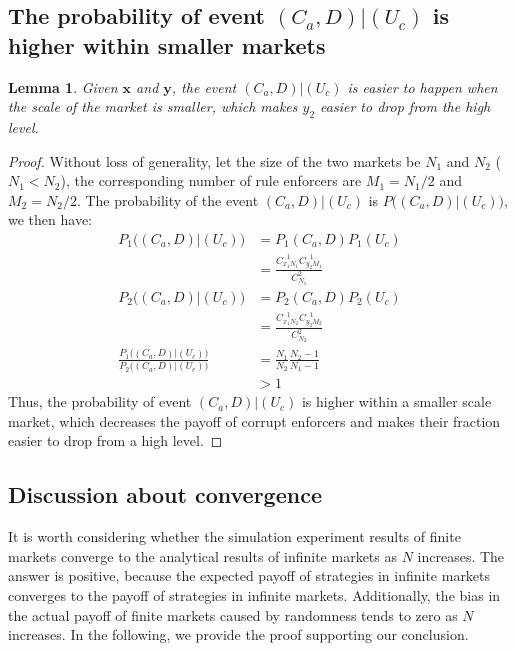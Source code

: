 \documentclass[letterpaper,10pt]{article}
\numberwithin{equation}{section}
\newtheorem{lemma}[theorem]{Lemma}
\begin{document}
\subsection{The probability of event \texorpdfstring{$ (C_{a}, D)|(U_{c}) $ is higher within smaller markets}{(Ca, D)|(Uc)}}\label{AppendixC5}
\begin{lemma}
    Given $ \mathbf{x} $ and $ \mathbf{y} $, the event $ (C_{a}, D)|(U_{c}) $ is easier to happen when the scale of the market is smaller, which makes $ y_{2} $ easier to drop from the high level.
    \label{L3}
\end{lemma}

\begin{proof}
    Without loss of generality, let the size of the two markets be $ N_{1} $ and $ N_{2} $ ($ N_{1} < N_{2} $), the corresponding number of rule enforcers are $ M_{1} = N_{1}/2 $ and $ M_{2} = N_{2}/2 $. The probability of the event $ (C_{a}, D)|(U_{c}) $ is $ P\bigl((C_{a}, D)|(U_{c})\bigr) $, we then have:
    \begin{equation}
        \begin{split}
            P_{1}\bigl((C_{a}, D)|(U_{c})\bigr) & = P_{1}(C_{a}, D)P_{1}(U_{c}) \\
                               & = \frac{C_{x_{1}N_{1}}^{\phantom{x}1}C_{y_{2}M_{1}}^{\phantom{x}1}}{C_{N_{1}}^{2}}\\
            P_{2}\bigl((C_{a}, D)|(U_{c})\bigr) & = P_{2}(C_{a}, D)P_{2}(U_{c}) \\
                               & = \frac{C_{x_{1}N_{2}}^{\phantom{x}1}C_{y_{2}M_{2}}^{\phantom{x}1}}{C_{N_{2}}^{2}}\\
            \frac{P_{1}\bigl((C_{a}, D)|(U_{c})\bigr)}{P_{2}\bigl((C_{a}, D)|(U_{c})\bigr)} & = \frac{N_{1}}{N_{2}}\frac{N_{2}-1}{N_{1}-1} \\
                                & > 1
        \end{split}
    \end{equation}
    Thus, the probability of event $ (C_{a}, D)|(U_{c}) $ is higher within a smaller scale market, which decreases the payoff of corrupt enforcers and makes their fraction easier to drop from a high level.
\end{proof}

\pagebreak
\subsection{Discussion about convergence}\label{AppendixC6}
It is worth considering whether the simulation experiment results of finite markets converge to the analytical results of infinite markets as $ N $ increases. The answer is positive, because the expected payoff of strategies in infinite markets converges to the payoff of strategies in infinite markets. Additionally, the bias in the actual payoff of finite markets caused by randomness tends to zero as $ N $ increases. In the following, we provide the proof supporting our conclusion.
\end{document}
